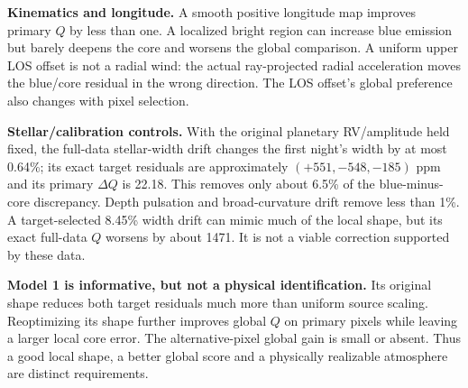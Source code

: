 \textbf{Kinematics and longitude.} A smooth positive longitude map improves primary $Q$ by less than one. A localized bright region can increase blue emission but barely deepens the core and worsens the global comparison. A uniform upper LOS offset is not a radial wind: the actual ray-projected radial acceleration moves the blue/core residual in the wrong direction. The LOS offset's global preference also changes with pixel selection.

\textbf{Stellar/calibration controls.} With the original planetary RV/amplitude held fixed, the full-data stellar-width drift changes the first night's width by at most 0.64\%; its exact target residuals are approximately $(+551,-548,-185)$ ppm and its primary $\Delta Q$ is 22.18. This removes only about 6.5\% of the blue-minus-core discrepancy. Depth pulsation and broad-curvature drift remove less than 1\%. A target-selected 8.45\% width drift can mimic much of the local shape, but its exact full-data $Q$ worsens by about 1471. It is not a viable correction supported by these data.

\textbf{Model 1 is informative, but not a physical identification.} Its original shape reduces both target residuals much more than uniform source scaling. Reoptimizing its shape further improves global $Q$ on primary pixels while leaving a larger local core error. The alternative-pixel global gain is small or absent. Thus a good local shape, a better global score and a physically realizable atmosphere are distinct requirements.
